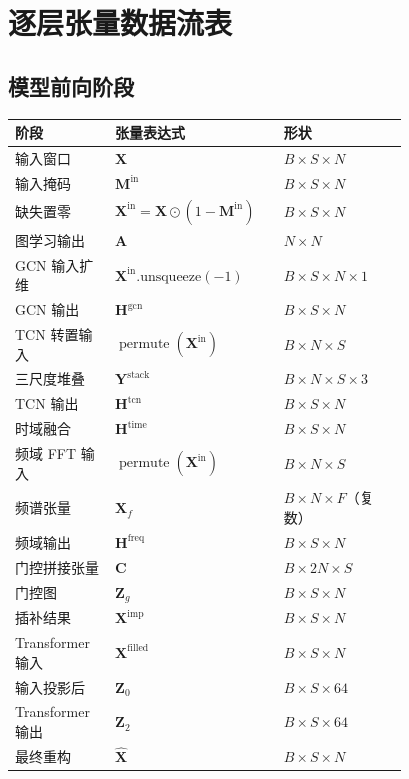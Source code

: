\documentclass[UTF8]{ctexart}
\begin{document}
\section{逐层张量数据流表}

\subsection{模型前向阶段}

\begin{longtable}{>{\raggedright\arraybackslash}p{0.22\linewidth} >{\raggedright\arraybackslash}p{0.28\linewidth} >{\raggedright\arraybackslash}p{0.28\linewidth}}
\toprule
阶段 & 张量表达式 & 形状 \\
\midrule
\endhead
输入窗口 & $\bm{X}$ & $B \times S \times N$ \\
输入掩码 & $\bm{M}^{\text{in}}$ & $B \times S \times N$ \\
缺失置零 & $\bm{X}^{\text{in}} = \bm{X}\odot(1-\bm{M}^{\text{in}})$ & $B \times S \times N$ \\
图学习输出 & $\bm{A}$ & $N \times N$ \\
GCN 输入扩维 & $\bm{X}^{\text{in}}.\text{unsqueeze}(-1)$ & $B \times S \times N \times 1$ \\
GCN 输出 & $\bm{H}^{\text{gcn}}$ & $B \times S \times N$ \\
TCN 转置输入 & $\operatorname{permute}(\bm{X}^{\text{in}})$ & $B \times N \times S$ \\
三尺度堆叠 & $\bm{Y}^{\text{stack}}$ & $B \times N \times S \times 3$ \\
TCN 输出 & $\bm{H}^{\text{tcn}}$ & $B \times S \times N$ \\
时域融合 & $\bm{H}^{\text{time}}$ & $B \times S \times N$ \\
频域 FFT 输入 & $\operatorname{permute}(\bm{X}^{\text{in}})$ & $B \times N \times S$ \\
频谱张量 & $\bm{X}_f$ & $B \times N \times F$（复数） \\
频域输出 & $\bm{H}^{\text{freq}}$ & $B \times S \times N$ \\
门控拼接张量 & $\bm{C}$ & $B \times 2N \times S$ \\
门控图 & $\bm{Z}_g$ & $B \times S \times N$ \\
插补结果 & $\bm{X}^{\text{imp}}$ & $B \times S \times N$ \\
Transformer 输入 & $\bm{X}^{\text{filled}}$ & $B \times S \times N$ \\
输入投影后 & $\bm{Z}_0$ & $B \times S \times 64$ \\
Transformer 输出 & $\bm{Z}_2$ & $B \times S \times 64$ \\
最终重构 & $\hat{\bm{X}}$ & $B \times S \times N$ \\
\bottomrule
\end{longtable}
\end{document}
